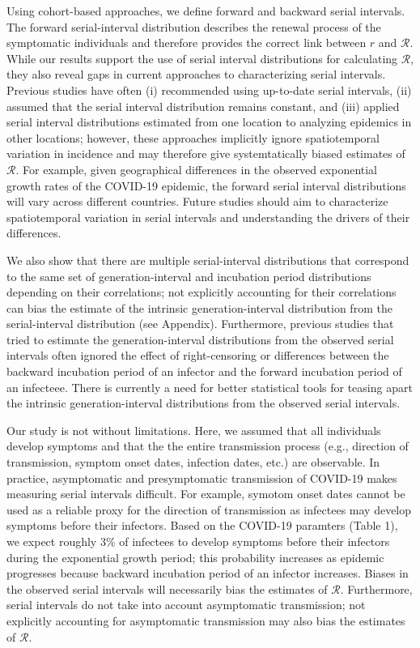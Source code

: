 \documentclass[12pt]{article}
\begin{document}
Using cohort-based approaches, we define forward and backward serial intervals.
The forward serial-interval distribution describes the renewal process of the symptomatic individuals and therefore provides the correct link between $r$ and $\mathcal R$.
While our results support the use of serial interval distributions for calculating $\mathcal R$, 
they also reveal gaps in current approaches to characterizing serial intervals.
Previous studies have often (i) recommended using up-to-date serial intervals, (ii) assumed that the serial interval distribution remains constant, and (iii) applied serial interval distributions estimated from one location to analyzing epidemics in other locations;
however, these approaches implicitly ignore spatiotemporal variation in incidence and may therefore give systemtatically biased estimates of $\mathcal R$. 
For example, given geographical differences in the observed exponential growth rates of the COVID-19 epidemic, the forward serial interval distributions will vary across different countries.
Future studies should aim to characterize spatiotemporal variation in serial intervals and understanding the drivers of their differences.

We also show that there are multiple serial-interval distributions that correspond to the same set of generation-interval and incubation period distributions depending on their correlations;
not explicitly accounting for their correlations can bias the estimate of the intrinsic generation-interval distribution from the serial-interval distribution (see Appendix).
Furthermore, previous studies that tried to estimate the generation-interval distributions from the observed serial intervals often ignored the effect of right-censoring or differences between the backward incubation period of an infector and the forward incubation period of an infecteee.
There is currently a need for better statistical tools for teasing apart the intrinsic generation-interval distributions from the observed serial intervals.

Our study is not without limitations.
Here, we assumed that all individuals develop symptoms and that the the entire transmission process (e.g., direction of transmission, symptom onset dates, infection dates, etc.) are observable.
In practice, asymptomatic and presymptomatic transmission of COVID-19 makes measuring serial intervals difficult.
For example, symotom onset dates cannot be used as a reliable proxy for the direction of transmission as infectees may develop symptoms before their infectors.
Based on the COVID-19 paramters (Table 1), we expect roughly 3\% of infectees to develop symptoms before their infectors during the exponential growth period; 
this probability increases as epidemic progresses because backward incubation period of an infector increases.
Biases in the observed serial intervals will necessarily bias the estimates of $\mathcal R$.
Furthermore, serial intervals do not take into account asymptomatic transmission; 
not explicitly accounting for asymptomatic transmission may also  bias the estimates of $\mathcal R$.
\end{document}

